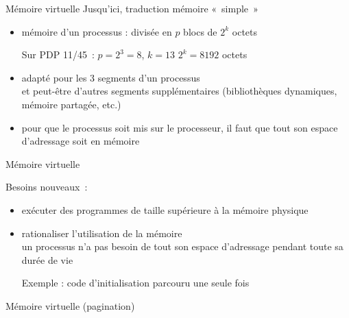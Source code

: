 
\begin {frame} {Mémoire virtuelle}
    Jusqu'ici, traduction mémoire «~simple~»

    \begin {itemize}
	\item mémoire d'un processus : divisée en
	    $p$ blocs de $2^k$ octets

	    Sur PDP 11/45~: $p=2^3 = 8$, $k=13$ \implique $2^k = 8192$ octets

	\item adapté pour les 3 segments d'un processus \\
	    et peut-être d'autres segments supplémentaires
	    (bibliothèques dynamiques, mémoire partagée, etc.)

	\item pour que le processus soit mis sur le processeur,
	    il faut que tout son espace d'adressage soit en mémoire
    \end {itemize}
\end {frame}

\begin {frame} {Mémoire virtuelle}

    Besoins nouveaux~:
    \begin {itemize}
	\item exécuter des programmes de taille supérieure à la
	    mémoire physique

	\item rationaliser l'utilisation de la mémoire \\
	    un processus n'a pas besoin de tout son espace d'adressage
	    pendant toute sa durée de vie

	    Exemple : code d'initialisation parcouru une seule
	    fois
    \end {itemize}

    \vspace* {3mm}

    \implique Mémoire virtuelle (pagination)

\end {frame}

